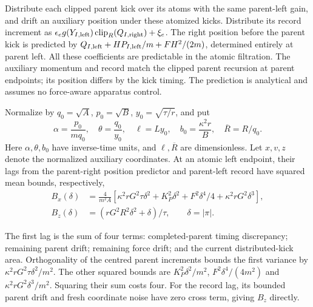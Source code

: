 \documentclass[11pt,a4paper]{article}
\begin{document}
Distribute each clipped parent kick over its atoms with the same
parent-left gain, and drift an auxiliary position under these atomized
kicks. Distribute its record increment as
\(\epsilon_e g(Y_{I,\rm left})\operatorname{clip}_R(Q_{I,\rm right}) +\xi_e\).
The right position before the parent kick is predicted by
\(Q_{I,\rm left}+HP_{I,\rm left}/m+FH^2/(2m)\), determined entirely at
parent left. All these coefficients are predictable in the atomic
filtration. The auxiliary momentum and record match the clipped parent
recursion at parent endpoints; its position differs by the kick timing.
The prediction is analytical and assumes no force-aware apparatus
control.

Normalize by \(q_0=\sqrt A\), \(p_0=\sqrt B\), \(y_0=\sqrt{\tau/r}\),
and put \[\alpha=\frac{p_0}{mq_0},\quad \theta=\frac{q_0}{y_0},\quad
\ell=Ly_0,\quad b_0=\frac{\kappa^2r}{B},\quad \overline R=R/q_0.\] Here
\(\alpha,\theta,b_0\) have inverse-time units, and \(\ell,\overline R\)
are dimensionless. Let \(x,v,z\) denote the normalized auxiliary
coordinates. At an atomic left endpoint, their lags from the
parent-right position predictor and parent-left record have squared mean
bounds, respectively, \[\begin{aligned}
B_x(\delta)&=\frac4{m^2A}
 [\kappa^2rG^2\tau\delta^2+K_P^2\delta^2
                      +F^2\delta^4/4+\kappa^2rG^2\delta^3],\\
B_z(\delta)&=(rG^2R^2\delta^2+\delta)/\tau,
\qquad \delta=|\pi|.
\end{aligned}\tag{85}\]

The first lag is the sum of four terms: completed-parent timing
discrepancy; remaining parent drift; remaining force drift; and the
current distributed-kick area. Orthogonality of the centred parent
increments bounds the first variance by
\(\kappa^2rG^2\tau\delta^2/m^2\). The other squared bounds are
\(K_P^2\delta^2/m^2\), \(F^2\delta^4/(4m^2)\) and
\(\kappa^2rG^2\delta^3/m^2\). Squaring their sum costs four. For the
record lag, its bounded parent drift and fresh coordinate noise have
zero cross term, giving \(B_z\) directly.
\end{document}
